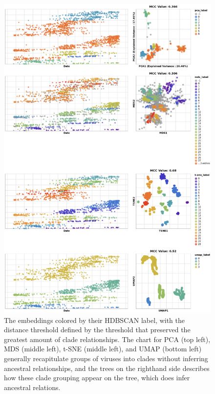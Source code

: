 \documentclass[9pt,lineno]{elife}
\begin{document}
\begin{figure}[htb]
  \begin{center}
  \includegraphics[width=\columnwidth]{fullHDBSCANChartFlu.png}
  \caption{
    The embeddings colored by their HDBSCAN label, with the distance threshold defined by the threshold that preserved the greatest amount of clade relationships.
    The chart for PCA (top left), MDS (middle left), t-SNE (middle left), and UMAP (bottom left) generally recapitulate groups of viruses into clades without inferring ancestral relationships, and the trees on the righthand side describes how these clade grouping appear on the tree, which does infer ancestral relations.
  }
  \label{fig:seasonal-influenza-h3n2-ha-clusters}
  \end{center}
\end{figure}
\end{document}
